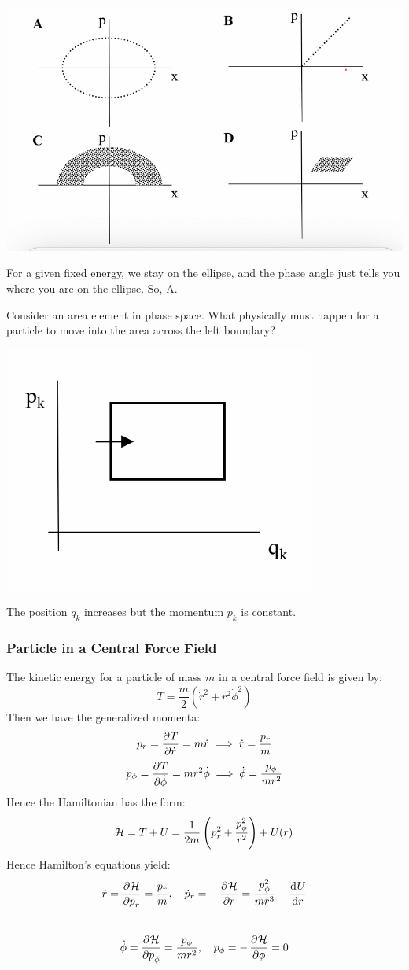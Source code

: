 \documentclass[../PHYS306Notes.tex]{subfiles}
\begin{document}
\begin{center}
    \includegraphics[scale=0.7]{Lecture-23/l23-img3.png}
\end{center}
\begin{s}
For a given fixed energy, we stay on the ellipse, and the phase angle just tells you where you are on the ellipse. So, A.
\end{s}
Consider an area element in phase space. What physically must happen for a particle to move into the area across the left boundary?
\begin{center}
    \includegraphics[scale=1]{Lecture-23/l23-img4.png}
\end{center}
\begin{s}
The position $q_k$ increases but the momentum $p_k$ is constant.
\end{s}

\subsubsection{Particle in a Central Force Field}
The kinetic energy for a particle of mass $m$ in a central force field is given by:
\[T = \frac{m}{2}\left(\dot{r}^2 + r^2\dot{\phi}^2\right)\]
Then we have the generalized momenta:
\[p_r = \dpd{T}{\dot{r}} = m\dot{r} \implies \dot{r} = \frac{p_r}{m}\]
\[p_\phi = \dpd{T}{\dot{\phi}} = mr^2\dot{\phi} \implies \dot{\phi} = \frac{p_\phi}{mr^2}\]
Hence the Hamiltonian has the form:
\[\mathcal{H} = T + U = \frac{1}{2m}\left(p_r^2 + \frac{p_\phi^2}{r^2}\right) + U(r)\]
Hence Hamilton's equations yield:
\[\dot{r} = \dpd{\HH}{p_r} = \frac{p_r}{m}, \quad \dot{p}_r = -\dpd{\HH}{r} = \frac{p_\phi^2}{mr^3} - \dod{U}{r}\]\
\[\dot{\phi} = \dpd{\HH}{p_\phi} = \frac{p_\phi}{mr^2}, \quad p_\phi = -\dpd{\HH}{\phi} = 0\]
\end{document}
